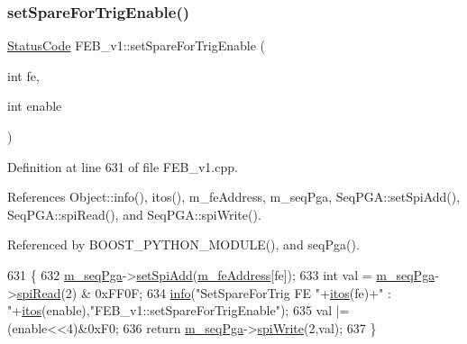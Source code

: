 \subsubsection{\texorpdfstring{set\+Spare\+For\+Trig\+Enable()}{setSpareForTrigEnable()}}
{\footnotesize\ttfamily \hyperlink{classStatusCode}{Status\+Code} F\+E\+B\+\_\+v1\+::set\+Spare\+For\+Trig\+Enable (\begin{DoxyParamCaption}\item[{int}]{fe,  }\item[{int}]{enable }\end{DoxyParamCaption})}



Definition at line 631 of file F\+E\+B\+\_\+v1.\+cpp.



References Object\+::info(), itos(), m\+\_\+fe\+Address, m\+\_\+seq\+Pga, Seq\+P\+G\+A\+::set\+Spi\+Add(), Seq\+P\+G\+A\+::spi\+Read(), and Seq\+P\+G\+A\+::spi\+Write().



Referenced by B\+O\+O\+S\+T\+\_\+\+P\+Y\+T\+H\+O\+N\+\_\+\+M\+O\+D\+U\+L\+E(), and seq\+Pga().


\begin{DoxyCode}
631                                                            \{
632   \hyperlink{classFEB__v1_a6c7804ac86796f233a8393043adf2e77}{m\_seqPga}->\hyperlink{classSeqPGA_ac998ce3a6d9b5f2e88cc8393f8c1df53}{setSpiAdd}(\hyperlink{classFEB__v1_a4e1945c2d5b434125f375e9d0fc6d99f}{m\_feAddress}[fe]);
633   \textcolor{keywordtype}{int} val = \hyperlink{classFEB__v1_a6c7804ac86796f233a8393043adf2e77}{m\_seqPga}->\hyperlink{classSeqPGA_ab3d0e5e5d4014bc7a92588a76b8713d4}{spiRead}(2) & 0xFF0F;
634   \hyperlink{classObject_a644fd329ea4cb85f54fa6846484b84a8}{info}(\textcolor{stringliteral}{"SetSpareForTrig FE "}+\hyperlink{Tools_8h_af330027dbdafb9a30768b3613c553e60}{itos}(fe)+\textcolor{stringliteral}{" : "}+\hyperlink{Tools_8h_af330027dbdafb9a30768b3613c553e60}{itos}(enable),\textcolor{stringliteral}{"FEB\_v1::setSpareForTrigEnable"});
635   val |= (enable<<4)&0xF0;
636   \textcolor{keywordflow}{return} \hyperlink{classFEB__v1_a6c7804ac86796f233a8393043adf2e77}{m\_seqPga}->\hyperlink{classSeqPGA_ad4421841ce4ce8b88ad13f63216f0743}{spiWrite}(2,val);
637 \}
\end{DoxyCode}
\mbox{\label{classFEB__v1_ab88d23abb96f746298e0fa1e1cf63e3e}} 
